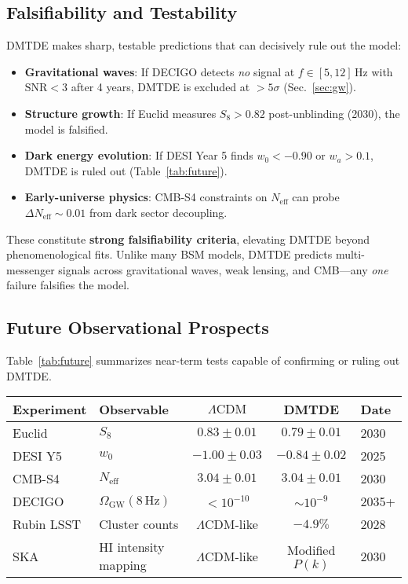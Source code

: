 \documentclass[aps,prd,twocolumn,superscriptaddress,nofootinbib,floatfix,preprintnumbers]{revtex4-2}
\newcommand{\DMTDE}{\textsc{DMTDE}\xspace}
\newcommand{\LCDM}{\ensuremath{\Lambda\text{CDM}}\xspace}
\begin{document}
\subsection{Falsifiability and Testability}
\label{subsec:falsifiability}

\DMTDE makes sharp, testable predictions that can decisively rule out the model:

\begin{itemize}
    \item \textbf{Gravitational waves}: If DECIGO detects \textit{no} signal at $f \in [5, 12]\,\mathrm{Hz}$ with $\mathrm{SNR} < 3$ after 4 years, \DMTDE is excluded at $>5\sigma$ (Sec.~\ref{sec:gw}).
    \item \textbf{Structure growth}: If Euclid measures $S_8 > 0.82$ post-unblinding (2030), the model is falsified.
    \item \textbf{Dark energy evolution}: If DESI Year 5 finds $w_0 < -0.90$ or $w_a > 0.1$, \DMTDE is ruled out (Table~\ref{tab:future}).
    \item \textbf{Early-universe physics}: CMB-S4 constraints on $N_\mathrm{eff}$ can probe $\Delta N_\mathrm{eff} \sim 0.01$ from dark sector decoupling.
\end{itemize}

These constitute \textbf{strong falsifiability criteria}, elevating \DMTDE beyond phenomenological fits. Unlike many BSM models, DMTDE predicts multi-messenger signals across gravitational waves, weak lensing, and CMB—any \textit{one} failure falsifies the model.

\subsection{Future Observational Prospects}
\label{subsec:future}

Table~\ref{tab:future} summarizes near-term tests capable of confirming or ruling out \DMTDE.

\begin{table*}[t]
\caption{Future observational tests of \DMTDE. Green rows indicate feasible detection; red indicates potential falsification if results favor \LCDM.}
\label{tab:future}
\centering
\begin{tabular}{llccl}
\toprule
\textbf{Experiment} & \textbf{Observable} & \textbf{\LCDM} & \textbf{\DMTDE} & \textbf{Date} \\
\midrule
Euclid & $S_8$ & $0.83 \pm 0.01$ & $0.79 \pm 0.01$ & 2030 \\
DESI Y5 & $w_0$ & $-1.00 \pm 0.03$ & $-0.84 \pm 0.02$ & 2025 \\
CMB-S4 & $N_\mathrm{eff}$ & $3.04 \pm 0.01$ & $3.04 \pm 0.01$ & 2030 \\
DECIGO & $\Omega_\mathrm{GW}(8\,\mathrm{Hz})$ & $< 10^{-10}$ & $\sim 10^{-9}$ & 2035+ \\
Rubin LSST & Cluster counts & \LCDM-like & $-4.9\%$ & 2028 \\
SKA & HI intensity mapping & \LCDM-like & Modified $P(k)$ & 2030 \\
\bottomrule
\end{tabular}
\end{table*}
\end{document}
